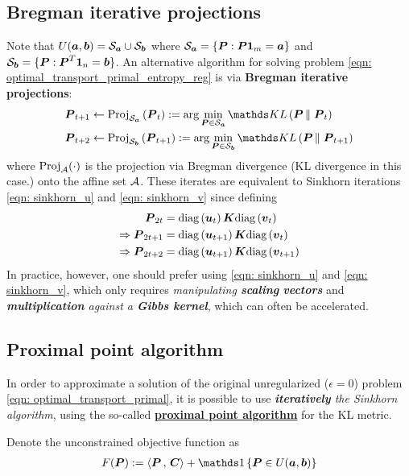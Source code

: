 \documentclass[11pt]{article}
\begin{document}
\subsection{Bregman iterative projections}
Note that $U(\boldsymbol{a}, \boldsymbol{b}) = {\mathcal S}_{\boldsymbol{a}}\cup {\mathcal S}_{\boldsymbol{b}}$ where ${\mathcal S}_{\boldsymbol{a}}= \{\boldsymbol{P}: \boldsymbol{P}\boldsymbol{1}_{m} = \boldsymbol{a}\}$ and  ${\mathcal S}_{\boldsymbol{b}}= \{\boldsymbol{P}: \boldsymbol{P}^{T}\boldsymbol{1}_{n} = \boldsymbol{b}\}$. An alternative algorithm for solving problem \eqref{eqn: optimal_transport_primal_entropy_reg} is via \textbf{Bregman
iterative projections}: 
\begin{align}
\mb{P}_{t+1} &\leftarrow \text{Proj}_{\cS_{\mb{a}}}\paren{\mb{P}_{t}} :=  \arg\min_{\mb{P} \in \cS_{\mb{a}}}\kl{\mb{P}}{\mb{P}_{t}} \label{eqn: bregman_iter_a}\\
\mb{P}_{t+2} &\leftarrow \text{Proj}_{\cS_{\mb{b}}}\paren{\mb{P}_{t+1}}:=  \arg\min_{\mb{P} \in \cS_{\mb{b}}}\kl{\mb{P}}{\mb{P}_{t+1}} \label{eqn: bregman_iter_b}
\end{align} where $\text{Proj}_{{\mathcal A}}(\cdot)$ is the projection via Bregman divergence (KL divergence in this case.) onto the affine set ${\mathcal A}$. These iterates are equivalent to Sinkhorn iterations \eqref{eqn: sinkhorn_u} and \eqref{eqn: sinkhorn_v} since defining
\begin{align*}
\boldsymbol{P}_{2t} &= \text{diag}\left(\boldsymbol{u}_{t}\right)\boldsymbol{K}\text{diag}\left(\boldsymbol{v}_{t}\right)\\
\Rightarrow \boldsymbol{P}_{2t+1} &= \text{diag}\left(\boldsymbol{u}_{t+1}\right)\boldsymbol{K}\text{diag}\left(\boldsymbol{v}_{t}\right)\\
\Rightarrow \boldsymbol{P}_{2t+2} &= \text{diag}\left(\boldsymbol{u}_{t+1}\right)\boldsymbol{K}\text{diag}\left(\boldsymbol{v}_{t+1}\right)
\end{align*}
In practice, however, one should prefer using \eqref{eqn: sinkhorn_u} and \eqref{eqn: sinkhorn_v}, which only requires \emph{manipulating \textbf{scaling} \textbf{vectors}} and \emph{\textbf{multiplication} against a \textbf{Gibbs kernel}}, which can often be accelerated.

\subsection{Proximal point algorithm}
In order to approximate a solution of the original unregularized ($\epsilon = 0$) problem \eqref{eqn: optimal_transport_primal}, it is possible to use \emph{\textbf{iteratively} the Sinkhorn algorithm}, using the so-called \underline{\textbf{proximal point algorithm}} for the KL metric.

Denote the unconstrained objective function as
\begin{align*}
F(\mb{P}) := \inn{\mb{P}}{\mb{C}} + \ind{\mb{P} \in U(\mb{a}, \mb{b}) }
\end{align*}
\end{document}
